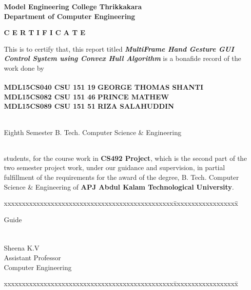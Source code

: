 \documentclass[11pt]{report}
\begin{document}
\begin{titlepage}
\begin{center}
\Large{\textbf{Model Engineering College Thrikkakara}}\\
\Large{\textbf{Department of Computer Engineering}}\\
\end{center}
\begin{figure}[h]
\begin{center}
\end{center}
\end{figure}
\begin{center}
\Large{\textbf{C E R T I F I C A T E}}\\
\vspace{.1in}
\end{center}
This is to certify that, this report titled \textbf{\textit{MultiFrame Hand Gesture GUI Control System using Convex Hull Algorithm}} is a bonafide record of the work done by\\
\\
\Large{\textbf{MDL15CS040 CSU 151 19}}	\hspace{.1in}	\Large{\textbf{GEORGE THOMAS SHANTI}}\\ 
\Large{\textbf{MDL15CS082 CSU 151 46}}	\hspace{.1in}	\Large{\textbf{PRINCE MATHEW}}\\ 
\Large{\textbf{MDL15CS089 CSU 151 51}}	\hspace{.1in}	\Large{\textbf{RIZA SALAHUDDIN}}\\ 
\\
\normalsize
\centerline  {\textsf{Eighth Semester B. Tech. Computer Science \& Engineering}}\\
students,  for the course work in \textbf{CS492 Project}, which is the second part of the two semester project work, under our guidance and supervision, in partial 
 fulfillment of the requirements for the award of the degree, B. Tech. Computer 
Science \& Engineering of \textbf{APJ Abdul Kalam Technological University}.

\footnotesize
\vspace{.1in}
\begin{tabbing}
xxxxxxxxxxxxxxxxxxxxxxxxxxxxxxxxxxxxxxxxxxxxxxx\= xxxxxxxxxxxxxxxxxx\= \kill

Guide		\>				
\\
\\
\\
Sheena K.V \>\>\\
Assistant Professor	\>\>\\
Computer Engineering	\>\>	
\end{tabbing}
\vspace{.1in}
\begin{tabbing}
xxxxxxxxxxxxxxxxxxxxxxxxxxxxxxxxxxxxxxxxxxxxxxx\= xxxxxxxxxxxxxxxxxx\= \kill


\end{tabbing}
\end{titlepage}
\end{document}
